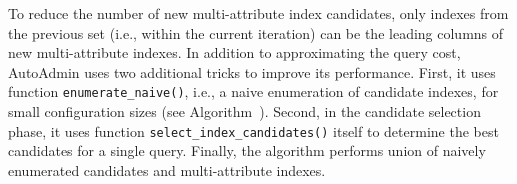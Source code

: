 \begin{algorithm}[!ht]
    \small
    \DontPrintSemicolon
    


\caption{AutoAdmin -- function \textit{create\_multicolumn\_indexes()}}
\end{algorithm}

To reduce the number of new multi-attribute index candidates, only indexes from the previous set (i.e., within the current iteration) can be the leading columns of new multi-attribute indexes. In addition to approximating the query cost, AutoAdmin uses two additional tricks to improve its performance.  First, it uses function \texttt{enumerate\_naive()}, i.e., a naive enumeration of candidate indexes, for small configuration sizes (see Algorithm~). Second, in the candidate selection phase, it uses function \texttt{select\_index\_candidates()} itself to determine the best candidates for a single query. Finally, the algorithm performs union of naively enumerated candidates and multi-attribute indexes.

